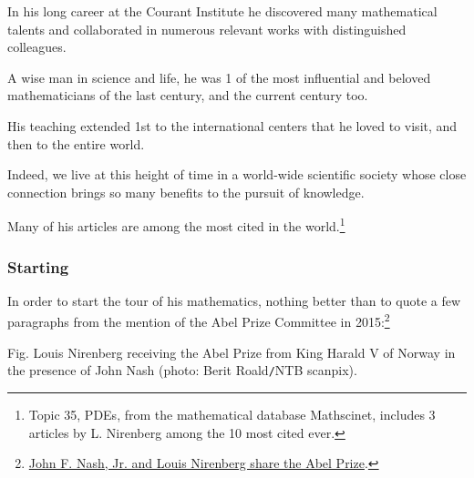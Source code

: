 \documentclass{article}
\begin{document}
In his long career at the Courant Institute he discovered many mathematical talents and collaborated in numerous relevant works with distinguished colleagues.

A wise man in science and life, he was 1 of the most influential and beloved mathematicians of the last century, and the current century too.

His teaching extended 1st to the international centers that he loved to visit, and then to the entire world.

Indeed, we live at this height of time in a world-wide scientific society whose close connection brings so many benefits to the pursuit of knowledge.

Many of his articles are among the most cited in the world.\footnote{Topic 35, PDEs, from the mathematical database Mathscinet, includes 3 articles by L. Nirenberg among the 10 most cited ever.}

\subsubsection{Starting}
In order to start the tour of his mathematics, nothing better than to quote a few paragraphs from the mention of the Abel Prize Committee in 2015:\footnote{\href{https://www.abelprize.no/nyheter/vis.html?tid=63589}{John F. Nash, Jr. and Louis Nirenberg share the Abel Prize}.}

\textsf{Fig. Louis Nirenberg receiving the Abel Prize from King Harald V of Norway in the presence of John Nash (photo: Berit Roald{\tt/}NTB scanpix).}
\end{document}
